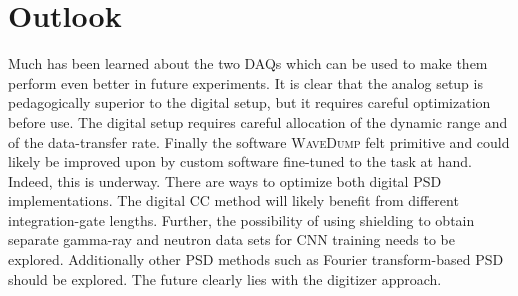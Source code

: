 \documentclass[main.tex]{subfiles}
\begin{document}
\section{Outlook}
Much has been learned about the two DAQs which can be used to make them perform even better in future experiments. 
It is clear that the analog setup is pedagogically superior to the digital setup, but it requires careful optimization before use. The digital setup requires careful allocation of the dynamic range and of the data-transfer rate. Finally the software \textsc{WaveDump} felt primitive and could likely be improved upon by custom software fine-tuned to the task at hand. Indeed, this is underway.
There are ways to optimize both digital PSD implementations. The digital CC method will likely benefit from different integration-gate lengths. Further, the possibility of using shielding to obtain separate gamma-ray and neutron data sets for CNN training needs to be explored. Additionally other PSD methods such as Fourier transform-based PSD should be explored. The future clearly lies with the digitizer approach.
\end{document}
